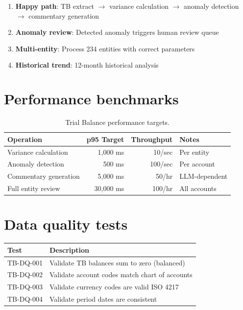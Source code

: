 \begin{enumerate}
  \item \textbf{Happy path}: TB extract $\rightarrow$ variance calculation
        $\rightarrow$ anomaly detection $\rightarrow$ commentary generation
  \item \textbf{Anomaly review}: Detected anomaly triggers human review queue
  \item \textbf{Multi-entity}: Process 234 entities with correct parameters
  \item \textbf{Historical trend}: 12-month historical analysis
\end{enumerate}

\section{Performance benchmarks}

\begin{table}[htbp]
\centering
\caption{Trial Balance performance targets.}
\footnotesize
\begin{tabularx}{\linewidth}{@{}l r r X@{}}
\toprule
\textbf{Operation} & \textbf{p95 Target} & \textbf{Throughput} & \textbf{Notes} \\ \midrule
Variance calculation & 1,000 ms & 10/sec & Per entity \\
Anomaly detection & 500 ms & 100/sec & Per account \\
Commentary generation & 5,000 ms & 50/hr & LLM-dependent \\
Full entity review & 30,000 ms & 100/hr & All accounts \\
\bottomrule
\end{tabularx}
\end{table}

\section{Data quality tests}

\begin{tabularx}{\linewidth}{@{}l X@{}}
\toprule
\textbf{Test} & \textbf{Description} \\ \midrule
TB-DQ-001 & Validate TB balances sum to zero (balanced) \\
TB-DQ-002 & Validate account codes match chart of accounts \\
TB-DQ-003 & Validate currency codes are valid ISO 4217 \\
TB-DQ-004 & Validate period dates are consistent \\
\bottomrule
\end{tabularx}

